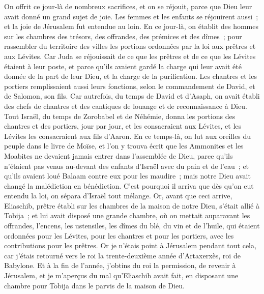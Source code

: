 \begin{multicols}{2}
On offrit ce jour-là de nombreux sacrifices, et on se réjouit, parce que Dieu leur avait donné un grand sujet de joie. Les femmes et les enfants se réjouirent aussi~; et la joie de Jérusalem fut entendue au loin.
En ce jour-là, on établit des hommes sur les chambres des trésors, des offrandes, des prémices et des dîmes~; pour rassembler du territoire des villes les portions ordonnées par la loi aux prêtres et aux Lévites. Car Juda se réjouissait de ce que les prêtres et de ce que les Lévites étaient à leur poste,
et parce qu'ils avaient gardé la charge qui leur avait été donnée de la part de leur Dieu, et la charge de la purification. Les chantres et les portiers remplissaient aussi leurs fonctions, selon le commandement de David, et de Salomon, son fils.
Car autrefois, du temps de David et d'Asaph, on avait établi des chefs de chantres et des cantiques de louange et de reconnaissance à Dieu.
Tout Israël, du temps de Zorobabel et de Néhémie, donna les portions des chantres et des portiers, jour par jour, et les consacraient aux Lévites, et les Lévites les consacraient aux fils d'Aaron.
\VerseOne{}En ce temps-là, on lut aux oreilles du peuple dans le livre de Moïse, et l'on y trouva écrit que les Ammonites et les Moabites ne devaient jamais entrer dans l'assemblée de Dieu,
parce qu'ils n'étaient pas venus au-devant des enfants d'Israël avec du pain et de l'eau~; et qu'ils avaient loué Balaam contre eux pour les maudire~; mais notre Dieu avait changé la malédiction en bénédiction.
 C'est pourquoi il arriva que dès qu'on eut entendu la loi, on sépara d'Israël tout mélange.
Or, avant que ceci arrive, Eliaschib, prêtre établi sur les chambres de la maison de notre Dieu, s'était allié à Tobija~;
et lui avait disposé une grande chambre, où on mettait auparavant les offrandes, l'encens, les ustensiles, les dîmes du blé, du vin et de l'huile, qui étaient ordonnées pour les Lévites, pour les chantres et pour les portiers, avec les contributions pour les prêtres.
Or je n'étais point à Jérusalem pendant tout cela, car j'étais retourné vers le roi la trente-deuxième année d'Artaxerxès, roi de Babylone. Et à la fin de l'année, j'obtins du roi la permission,
de revenir à Jérusalem, et je m'aperçus du mal qu'Eliaschib avait fait, en disposant une chambre pour Tobija dans le parvis de la maison de Dieu.

\end{multicols}
